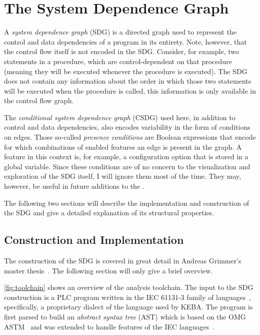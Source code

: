 \chapter{The System Dependence Graph} \label{ch:sdg}

A \emph{system dependence graph} (SDG) is a directed graph used to represent the control and data dependencies of a 
program in its entirety. Note, however, that the control flow itself is not encoded in the SDG. Consider, for example, 
two statements in a procedure, which are control-dependent on that procedure (meaning they will be executed whenever 
the procedure is executed). The SDG does not contain any information about the order in which those two statements will 
be executed when the procedure is called, this information is only available in the control flow graph.

The \emph{conditional system dependence graph} (CSDG) used here, in addition to control and data dependencies, also 
encodes variability in the form of conditions on edges. Those so-called \emph{presence conditions} are Boolean 
expressions that encode for which combinations of enabled features an edge is present in the graph. A feature in this 
context is, for example, a configuration option that is stored in a global variable. Since these conditions are of no 
concern to the visualization and exploration of the SDG itself, I will ignore them most of the time. They may, however, 
be useful in future additions to the \SB.

The following two sections will describe the implementation and construction of the SDG and give a detailed 
explanation of its structural properties.


\section{Construction and Implementation}

The construction of the SDG is covered in great detail in Andreas Grimmer's master thesis~\cite{GrimmerDA}. The 
following section will only give a brief overview.

\autoref{fig:toolchain} shows an overview of the analysis toolchain. The input to the SDG construction is a PLC program 
written in the IEC 61131-3 family of languages~\cite{IEC61131:2003}, specifically, a proprietary dialect of the 
language used by KEBA. The program is first parsed to build an \emph{abstract syntax tree} (AST) which is based on the 
OMG ASTM~\cite{ASTM} and was extended to handle features of the IEC languages~\cite[ch.~4]{GrimmerDA}.


